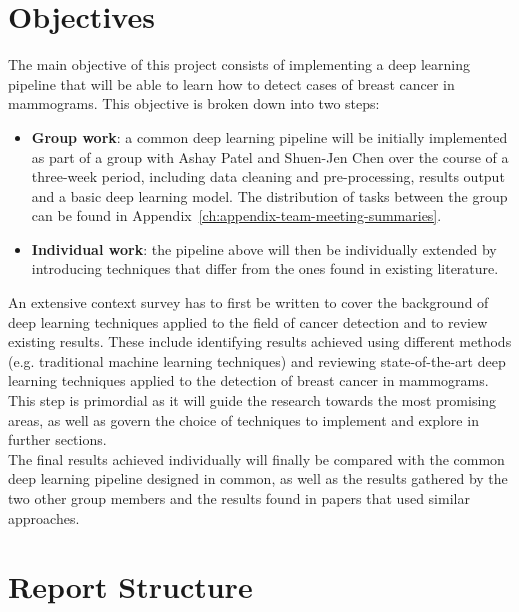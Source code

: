
\section{Objectives}
\label{sec:introduction-objectives}

The main objective of this project consists of implementing a deep learning pipeline that will be able to learn how to detect cases of breast cancer in mammograms. This objective is broken down into two steps:
\begin{itemize}
    \item \textbf{Group work}: a common deep learning pipeline will be initially implemented as part of a group with Ashay Patel and Shuen-Jen Chen over the course of a three-week period, including data cleaning and pre-processing, results output and a basic deep learning model. The distribution of tasks between the group can be found in Appendix~\ref{ch:appendix-team-meeting-summaries}.
    \item \textbf{Individual work}: the pipeline above will then be individually extended by introducing techniques that differ from the ones found in existing literature.
\end{itemize}

An extensive context survey has to first be written to cover the background of deep learning techniques applied to the field of cancer detection and to review existing results. These include identifying results achieved using different methods (e.g. traditional machine learning techniques) and reviewing state-of-the-art deep learning techniques applied to the detection of breast cancer in mammograms. This step is primordial as it will guide the research towards the most promising areas, as well as govern the choice of techniques to implement and explore in further sections.\\

The final results achieved individually will finally be compared with the common deep learning pipeline designed in common, as well as the results gathered by the two other group members and the results found in papers that used similar approaches.


\section{Report Structure}

